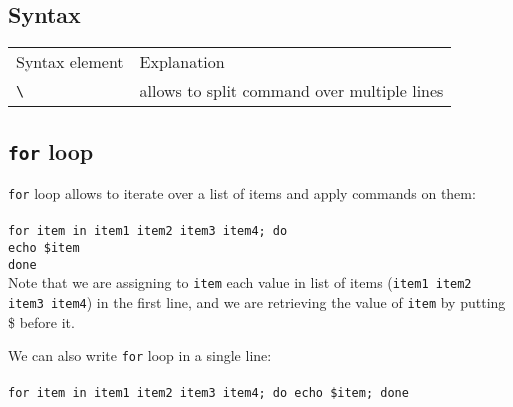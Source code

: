 \subsection{Syntax}
\begin{tabular}{ll}
  Syntax element & Explanation \\
  \hhline{==}
  \texttt{\textbackslash} & allows to split command over multiple lines\\
  
\end{tabular}
\subsection{\texttt{for} loop}
\texttt{for} loop allows to iterate over a list of items and apply commands on them:\\~\\
\texttt{for item in item1 item2 item3 item4; do\\
  \indent echo \$item \\
done}\\

Note that we are assigning to \texttt{item} each value in list of items 
(\texttt{item1 item2 item3 item4}) in the first line, and we are retrieving
the value of \texttt{item} by putting \$ before it.

We can also write \texttt{for} loop in a single line:\\~\\
\texttt{for item in item1 item2 item3 item4; do echo \$item; done}\\


